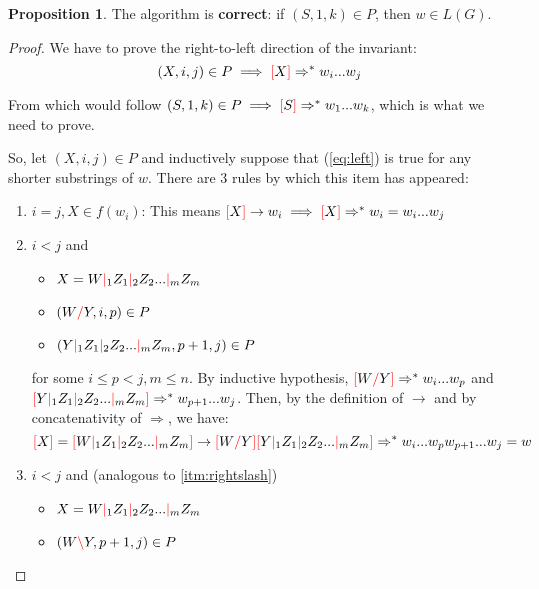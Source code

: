 \documentclass[12pt]{extarticle}
\theoremstyle{definition} \newtheorem{defn}{Definition}
\theoremstyle{definition} \newtheorem{prop}{Proposition}
\newcommand{\lc}{\textcolor{red}{\backslash}}
\newcommand{\rc}{\textcolor{red}{/}}
\newcommand{\mc}{\textcolor{red}{|}}
\newcommand{\lb}{\textcolor{red}{[}}
\newcommand{\rb}{\textcolor{red}{]}}
\begin{document}
\begin{prop}
    The algorithm is \textbf{correct}: if $(S, 1, k) \in P$, then $w \in L(G)$.
\end{prop}
\begin{proof}
    We have to prove the right-to-left direction of the invariant:
    \begin{equation}\label{eq:left}
        (X, i, j) \in P \implies \lb X \rb \Rightarrow^* w_i ... w_j
    \end{equation}

    From which would follow $ (S, 1, k) \in P \implies \lb S \rb \Rightarrow^* w_1 ... w_k$,
    which is what we need to prove.

    So, let $(X, i, j) \in P$ and inductively suppose that (\ref{eq:left}) is true
    for any shorter substrings of $w$. There are 3 rules by which this item has appeared:
    \begin{enumerate}
        \item $i = j, X \in f(w_i)$: This means
            $\lb X \rb \rightarrow w_i \implies \lb X \rb \Rightarrow^* w_i = w_i ... w_j$
        \item \label{itm:rightslash} $i < j$ and
            \begin{itemize}
                \item $X = W \mc_1 Z_1 \mc_2 Z_2 ... \mc_m Z_m$
                \item $(W \rc Y, i, p) \in P$
                \item $(Y \mc_1 Z_1 \mc_2 Z_2 ... \mc_m Z_m, p + 1, j) \in P$
            \end{itemize}
            for some $i \leq p < j, m \leq n$. By inductive hypothesis,
            $\lb W \rc Y \rb \Rightarrow^* w_i ... w_p$
            and
            $\lb Y \mc_1 Z_1 \mc_2 Z_2 ... \mc_m Z_m \rb \Rightarrow^* w_{p + 1} ... w_j$.
            Then, by the definition of $\rightarrow$ and by concatenativity of
            $\Rightarrow$, we have:
            \[
                \lb X \rb = \lb W \mc_1 Z_1 \mc_2 Z_2 ... \mc_m Z_m \rb
                \rightarrow
                \lb W \rc Y \rb \lb Y \mc_1 Z_1 \mc_2 Z_2 ... \mc_m Z_m \rb
                \Rightarrow^*
                w_i ... w_p w_{p + 1} ... w_j = w
            \]
        \item $i < j$ and (analogous to \ref{itm:rightslash})
            \begin{itemize}
                \item $X = W \mc_1 Z_1 \mc_2 Z_2 ... \mc_m Z_m$
                \item $(W \lc Y, p + 1, j) \in P$

\end{itemize}
\end{enumerate}
\end{proof}
\end{document}
